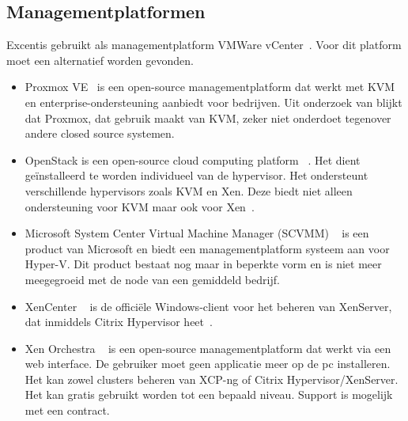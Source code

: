 \subsection{Managementplatformen}\label{subsec:managementplatformen}
Excentis gebruikt als managementplatform VMWare vCenter~\autocite{vmware}. Voor dit platform moet een alternatief worden gevonden.

\begin{itemize}
    \item Proxmox VE~\autocite{Proxmox} is een open-source managementplatform dat werkt met KVM en enterprise-ondersteuning aanbiedt voor bedrijven. Uit onderzoek van \textcite{ally2018comparative} blijkt dat Proxmox, dat gebruik maakt van KVM, zeker niet onderdoet tegenover andere closed source systemen.

    \item OpenStack is een open-source cloud computing platform ~\autocite{openstack2024}. Het dient geïnstalleerd te worden individueel van de hypervisor. Het ondersteunt verschillende hypervisors zoals KVM en Xen. Deze biedt niet alleen ondersteuning voor KVM maar ook voor Xen~\autocite{oleksiuk2023comparative}.

    \item Microsoft System Center Virtual Machine Manager (SCVMM) ~\autocite{microsoftvmm2025} is een product van Microsoft en biedt een managementplatform systeem aan voor Hyper-V. Dit product bestaat nog maar in beperkte vorm en is niet meer meegegroeid met de node van een gemiddeld bedrijf.

    \item XenCenter ~\autocite{xencenter2024} is de officiële Windows‑client voor het beheren van XenServer, dat inmiddels Citrix Hypervisor heet~\autocite{xenserverwebsite}.

    \item Xen Orchestra ~\autocite{el2021server} is een open-source managementplatform dat werkt via een web interface. De gebruiker moet geen applicatie meer op de pc installeren. Het kan zowel clusters beheren van XCP-ng of Citrix Hypervisor/XenServer. Het kan gratis gebruikt worden tot een bepaald niveau. Support is mogelijk met een contract.
\end{itemize}
